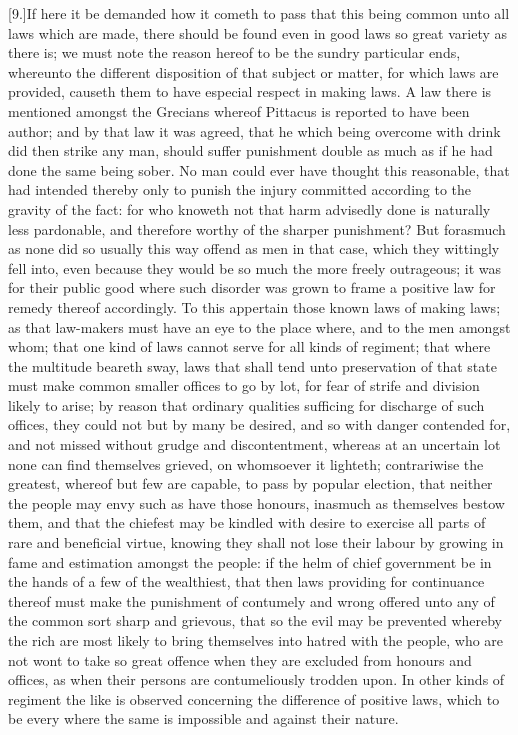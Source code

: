 [9.]If here it be demanded how it cometh to pass that this being common unto all laws which are made, there should be found even in good laws so great variety as there  is; we must note the reason hereof to be the sundry particular ends, whereunto the different disposition of that subject or matter, for which laws are provided, causeth them to have especial respect in making laws. A law there is mentioned amongst the Grecians whereof Pittacus is reported to have been author; and by that law it was agreed, that he which being overcome with drink did then strike any man, should suffer punishment double as much as if he had done the same being sober. No man could ever have thought this reasonable, that had intended thereby only to punish the injury committed according to the gravity of the fact: for who knoweth not that harm advisedly done is naturally less pardonable, and therefore worthy of the sharper punishment? But forasmuch as none did so usually this way offend as men in that case, which they wittingly fell into, even because they would be so much the more freely outrageous; it was for their public good where such disorder was grown to frame a positive law for remedy thereof accordingly. To this appertain those known laws of making laws; as that law-makers must have an eye to the place where, and to the men amongst whom; that one kind of laws cannot serve for all kinds of regiment; that where the multitude beareth sway, laws that shall tend unto preservation of that state must make common smaller offices to go by lot, for fear of strife and division likely to arise; by reason that ordinary qualities sufficing for discharge of such offices, they could not but by many be desired, and so with danger contended for, and not missed without grudge and discontentment, whereas at an uncertain lot none can find themselves grieved, on whomsoever it lighteth; contrariwise the greatest, whereof but few are capable, to pass by popular election, that neither the people may envy such as have those honours, inasmuch as themselves bestow them, and that the chiefest may be kindled with desire to exercise all parts of rare and beneficial virtue, knowing they shall not lose their labour by growing in fame and estimation amongst the people: if the helm of chief government be in the hands of a few of the wealthiest, that then laws providing for continuance thereof must make the punishment of contumely and wrong offered  unto any of the common sort sharp and grievous, that so the evil may be prevented whereby the rich are most likely to bring themselves into hatred with the people, who are not wont to take so great offence when they are excluded from honours and offices, as when their persons are contumeliously trodden upon. In other kinds of regiment the like is observed concerning the difference of positive laws, which to be every where the same is impossible and against their nature.

